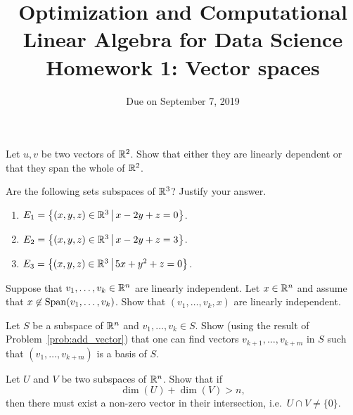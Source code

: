 \documentclass[11pt,nocut]{article}
\title{\vspace{-2.0cm}%
	Optimization and Computational Linear Algebra for Data Science\\
Homework 1: Vector spaces}
\date{\vspace{-1cm}Due on September 7, 2019}
\begin{document}
\maketitle



\begin{problem}
	Let $u,v$ be two vectors of $\mathbb{R}^2$. Show that either they are linearly dependent or that they span the whole of $\mathbb{R}^2$.
\end{problem}

\vspace{1mm}

\begin{problem}
	Are the following sets subspaces of $\mathbb{R}^3$? Justify your answer.
	\begin{enumerate}[label=\normalfont(\textbf{\alph*})]
		\item $E_1= \big\{ (x,y,z) \in \mathbb{R}^3 \, \big| \, x - 2y + z= 0 \big\}$.
		\item $E_2= \big\{ (x,y,z) \in \mathbb{R}^3 \, \big| \, x - 2y + z= 3 \big\}$.
		\item $E_3= \big\{ (x,y,z) \in \mathbb{R}^3 \, \big| \, 5x + y^2 + z= 0 \big\}$.
	\end{enumerate}
\end{problem}

\vspace{1mm}

\begin{problem}\label{prob:add_vector}
	Suppose that $v_1, \dots, v_k \in \mathbb{R}^n$ are linearly independent. Let $x \in \mathbb{R}^n$ and assume that $x \not\in {{\rm Span}}(v_1,\dots, v_k)$.
	Show that $(v_1,\dots,v_k,x)$ are linearly independent.
\end{problem}

\vspace{1mm}

\begin{problem}
	Let $S$ be a subspace of $\mathbb{R}^n$ and $v_1, \dots, v_k \in S$.
	Show (using the result of Problem~\ref{prob:add_vector}) that one can find vectors $v_{k+1}, \dots, v_{k+m}$ in $S$ such that $(v_1, \dots, v_{k+m})$ is a basis of $S$.
\end{problem}

\vspace{1mm}

\begin{problem}[$\star$]
	Let $U$ and $V$ be two subspaces of $\mathbb{R}^n$. Show that if
	$$
	\dim(U) + \dim(V) > n,
	$$
	then there must exist a non-zero vector in their intersection, i.e.\ $U \cap V \neq \{0\}$.
\end{problem}
\vspace{1cm}
\centerline{}

%
%
\end{document}
